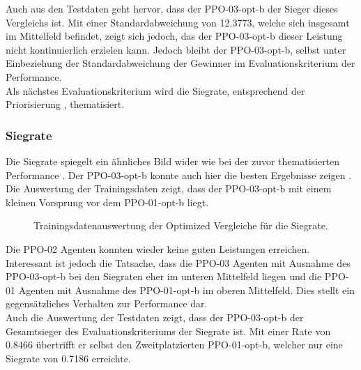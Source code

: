 Auch aus den Testdaten  geht hervor, dass der PPO-03-opt-b der Sieger dieses Vergleichs ist. Mit einer Standardabweichung von 12.3773, welche sich insgesamt im Mittelfeld befindet, zeigt sich jedoch, das der PPO-03-opt-b dieser Leistung nicht kontinuierlich erzielen kann. Jedoch bleibt der PPO-03-opt-b, selbst unter Einbeziehung der Standardabweichung der Gewinner im Evaluationskriterium der Performance.\\
Als nächstes Evaluationskriterium wird die Siegrate, entsprechend der Priorisierung , thematisiert.

\subsubsection{Siegrate} \label{sec:Evaluation_Siegrate_Optimized}
Die Siegrate spiegelt ein ähnliches Bild wider wie bei der zuvor thematisierten Performance . Der PPO-03-opt-b konnte auch hier die besten Ergebnisse zeigen . Die Auswertung der Trainingsdaten zeigt, dass der PPO-03-opt-b mit einem kleinen Vorsprung vor dem PPO-01-opt-b liegt.
\begin{figure}[H]
	\centering
	
	\caption[Siegrate - Auswertung der Trainingsdaten der Optimized Vergleiche]{Trainingsdatenauswertung der Optimized Vergleiche für die Siegrate.}
	\label{fig:Evaluation_Optimized_Winrate}
\end{figure}
Die PPO-02 Agenten konnten wieder keine guten Leistungen erreichen. Interessant ist jedoch die Tatsache, dass die PPO-03 Agenten mit Ausnahme des PPO-03-opt-b bei den Siegraten eher im unteren Mittelfeld liegen und die PPO-01 Agenten mit Ausnahme des PPO-01-opt-b im oberen Mittelfeld. Dies stellt ein gegensätzliches Verhalten zur Performance dar.\\
Auch die Auswertung der Testdaten  zeigt, dass der PPO-03-opt-b der Gesamtsieger des Evaluationskriteriums der Siegrate ist. Mit einer Rate von 0.8466 übertrifft er selbst den Zweitplatzierten PPO-01-opt-b, welcher nur eine Siegrate von 0.7186 erreichte.
